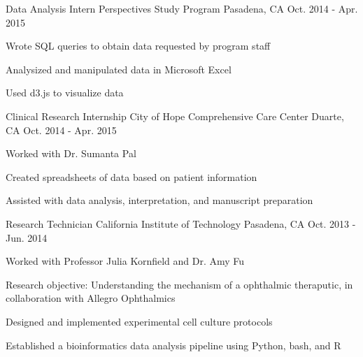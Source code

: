 

\begin{cventries}
  \cventry
    {Data Analysis Intern} %
    {Perspectives Study Program} %
    {Pasadena, CA} %
    {Oct. 2014 - Apr. 2015} %
    {
      \begin{cvitems} %
        \item {Wrote SQL queries to obtain data requested by program staff}
        \item {Analysized and manipulated data in Microsoft Excel}
        \item {Used d3.js to visualize data}
      \end{cvitems}
    }

  \cventry
    {Clinical Research Internship} %
    {City of Hope Comprehensive Care Center} %
    {Duarte, CA} %
    {Oct. 2014 - Apr. 2015} %
    {
      \begin{cvitems} %
        \item {Worked with Dr. Sumanta Pal}
        \item {Created spreadsheets of data based on patient information}
        \item {Assisted with data analysis, interpretation, and manuscript preparation}
      \end{cvitems}
    }

  \cventry
    {Research Technician} %
    {California Institute of Technology} %
    {Pasadena, CA} %
    {Oct. 2013 - Jun. 2014} %
    {
      \begin{cvitems} %
        \item {Worked with Professor Julia Kornfield and Dr. Amy Fu}
        \item {Research objective: Understanding the mechanism of a ophthalmic theraputic, in collaboration with Allegro Ophthalmics}
        \item {Designed and implemented experimental cell culture protocols}
        \item {Established a bioinformatics data analysis pipeline using Python, bash, and R}
      \end{cvitems}
    }


\end{cventries}
